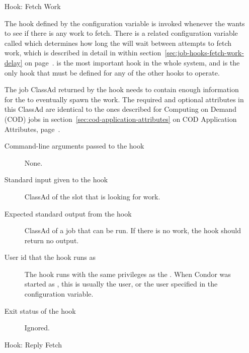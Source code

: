 \begin{itemize}
\item[Hook: Fetch Work]

The hook defined by the configuration variable
 is invoked whenever the 
wants to see if there is any work to fetch.
There is a related configuration variable called
 which determines how long the 
will wait between attempts to fetch work, which is described in detail
in within section~\ref{sec:job-hooks-fetch-work-delay} on
page~\pageref{sec:job-hooks-fetch-work-delay}.
 is the most important hook in the whole
system, and is the only hook that must be defined for any of the other
 hooks to operate.

The job ClassAd returned by the hook needs to contain enough
information for the  to eventually spawn the work.
The required and optional attributes in this ClassAd are identical to
the ones described for Computing on Demand (COD) jobs in
section~\ref{sec:cod-application-attributes} 
on COD Application Attributes, 
page~\pageref{sec:cod-application-attributes}.

\begin{description}
\item[Command-line arguments passed to the hook]
  None.

\item[Standard input given to the hook]
  ClassAd of the slot that is looking for work.

\item[Expected standard output from the hook]
  ClassAd of a job that can be run.
  If there is no work, the hook should return no output.

\item[User id that the hook runs as]
  The  hook runs with the same
privileges as the .  When Condor was started as ,
this is usually the  user, or the user specified in
the  configuration variable.

\item[Exit status of the hook]
  Ignored.
\end{description}


\item[Hook: Reply Fetch]


\end{itemize}
